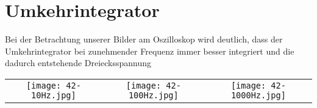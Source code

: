 

\def\weite{4cm}

\section{Umkehrintegrator}
Bei der Betrachtung unserer Bilder am Oszilloskop wird deutlich, dass der Umkehrintegrator bei zunehmender Frequenz immer besser integriert und die dadurch entstehende Dreiecksspannung\\
\begin{center}
    \begin{tabular}{c c c}
        \texttt{[image: 42-10Hz.jpg]} & \texttt{[image: 42-100Hz.jpg]} & \texttt{[image: 42-1000Hz.jpg]}
    \end{tabular}
\end{center}